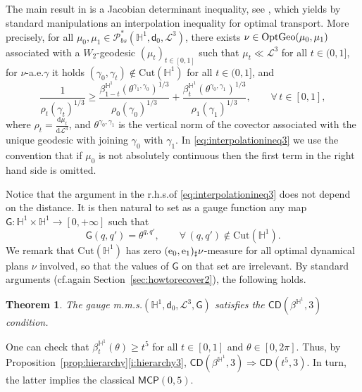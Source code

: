 \documentclass[11pt,a4paper]{article}
\theoremstyle{plain}
\newtheorem{theorem}{Theorem}[section]
\theoremstyle{definition}
\theoremstyle{remark}
\numberwithin{equation}{section}
\renewcommand{\H}{\mathbb{H}}
\newcommand{\Cut}{\mathrm{Cut}}
\newcommand{\CD}{\mathsf{CD}}
\newcommand{\MCP}{\mathsf{MCP}}
\newcommand{\OptGeo}{{\rm OptGeo}}
\newcommand{\Prob}{\mathcal{P}}
\newcommand{\di}{\mathrm{d}}
\newcommand{\ee}{{\rm e}}
\newcommand{\sfd}{\mathsf d}
\newcommand{\sfG}{\mathsf G}
\begin{document}
The main result in \cite[Thm.~1.1]{BKS} is a Jacobian determinant inequality, see \cite[Eq.\@ (3.17), p.\@ 61]{BKS},  which yields by standard manipulations an interpolation inequality for optimal transport. More precisely, for all  $\mu_0,\mu_1\in \Prob_{bs}^{*}(\mathbb{H}^{1},\sfd_0,\mathscr{L}^3)$, there exists $\nu\in\OptGeo(\mu_0,\mu_1)$ associated with a $W_2$-geodesic $(\mu_t)_{t\in [0,1]}$ such that $\mu_t \ll \mathscr{L}^3$ for all $t\in (0,1]$, for $\nu$-a.e.\@ $\gamma$ it holds $(\gamma_0,\gamma_t)\notin \Cut(\mathbb{H}^1)$ for all $t\in (0,1]$, and
\begin{equation}\label{eq:interpolationineq3}
\frac{1}{\rho_t(\gamma_t)^{1/3}}\geq \frac{\beta^{\mathbb{H}^{1}}_{1-t}(\theta^{\gamma_1,\gamma_0})^{1/3}}{\rho_0(\gamma_0)^{1/3}} + \frac{\beta^{\mathbb{H}^{1}}_{t}(\theta^{\gamma_0,\gamma_1})^{1/3}}{\rho_1(\gamma_1)^{1/3}},\qquad \forall\,t\in [0,1],
\end{equation}
where $\rho_t = \frac{\di \mu_t}{\di \mathscr{L}^3}$, and $\theta^{\gamma_0,\gamma_1}$ is the vertical norm of the covector associated with the  unique geodesic with joining $\gamma_0$ with $\gamma_1$.  In \eqref{eq:interpolationineq3} we use the convention that if $\mu_0$ is not absolutely continuous then the first term in the right hand side is omitted.

Notice that the argument in the r.h.s.\@ of \eqref{eq:interpolationineq3} does not depend on the distance. It is then natural to set as a gauge function any map $\sfG:\mathbb{H}^1\times \mathbb{H}^1\to [0,+\infty]$ such that
\begin{equation}\label{eq:sopradacancellare}
\sfG(q,q')= \theta^{q,q'}, \qquad \forall\,(q,q')\notin\Cut(\mathbb{H}^1).
\end{equation}
We remark that $\Cut(\mathbb{H}^1)$ has zero $(\ee_0,\ee_1)_\sharp\nu$-measure for all optimal dynamical plans $\nu$ involved, so that the values of $\sfG$ on that set are irrelevant.  By standard arguments (cf.\@ again Section~\ref{sec:howtorecover2}), the following holds.

\begin{theorem}
The gauge m.m.s.\@ $(\mathbb{H}^{1},\sfd_0,\mathscr{L}^3,\sfG)$ satisfies the $\CD(\beta^{\mathbb{H}^{1}},3)$ condition.
\end{theorem}


One can check that $\beta^{\H^1}_t(\theta) \geq t^{5}$ for all $t\in [0,1]$ and $\theta \in [0,2\pi]$. Thus, by Proposition~\ref{prop:hierarchy}\ref{i:hierarchy3}, $\CD(\beta^{\H^1},3) \Rightarrow \CD(t^{5},3)$. In turn, the latter implies the classical $\MCP(0,5)$.
\end{document}
